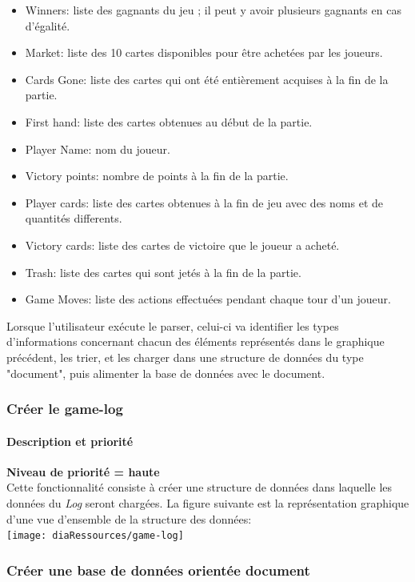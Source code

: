 \begin{itemize}
\item Winners: liste des gagnants du jeu ; il peut y avoir plusieurs gagnants en cas d'égalité.
\item Market: liste des 10 cartes disponibles pour être achetées par les joueurs.
\item Cards Gone: liste des cartes qui ont été entièrement acquises à la fin de la partie.
\item First hand: liste des cartes obtenues au début de la partie.%
\item Player Name: nom du joueur.
\item Victory points: nombre de points à la fin de la partie.
\item Player cards: liste des cartes obtenues à la fin de jeu avec des noms et de quantités differents.
\item Victory cards: liste des cartes de victoire que le joueur a acheté.
\item Trash: liste des cartes qui sont jetés à la fin de la partie.
\item Game Moves: liste des actions effectuées pendant chaque tour d'un joueur.
\end{itemize}
Lorsque l'utilisateur exécute le parser, celui-ci va identifier les types d'informations concernant chacun des éléments représentés dans le graphique précédent, les trier, et les charger dans une structure de données du type "document", puis alimenter la base de données avec le document. \\

\subsubsection{Créer le game-log}
\paragraph*{Description et priorité}
\textbf{Niveau de priorité = haute}\\
Cette fonctionnalité consiste à créer une structure de données dans laquelle les données du \textit{Log} seront chargées.
La figure suivante est la représentation graphique d'une vue d'ensemble de la structure des données:\\
\texttt{[image: diaRessources/game-log]}

\subsubsection{Créer une base de données orientée document }

